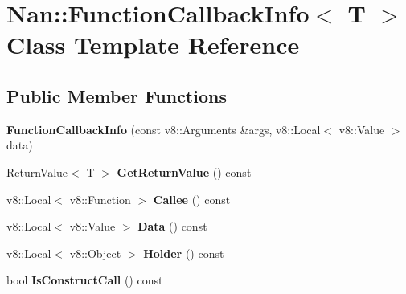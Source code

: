 \hypertarget{class_nan_1_1_function_callback_info}{}\section{Nan\+:\+:Function\+Callback\+Info$<$ T $>$ Class Template Reference}
\label{class_nan_1_1_function_callback_info}
\subsection*{Public Member Functions}
\begin{DoxyCompactItemize}
\item 
\mbox{\label{class_nan_1_1_function_callback_info_ab863f42f4fabad1d05c6285c05ee7789}} 
{\bfseries Function\+Callback\+Info} (const v8\+::\+Arguments \&args, v8\+::\+Local$<$ v8\+::\+Value $>$ data)
\item 
\mbox{\label{class_nan_1_1_function_callback_info_ad23cef574672532d7606b3959c6002ed}} 
\hyperlink{class_nan_1_1_return_value}{Return\+Value}$<$ T $>$ {\bfseries Get\+Return\+Value} () const
\item 
\mbox{\label{class_nan_1_1_function_callback_info_a86768f0fe5d5aa01c62a05710a7247c4}} 
v8\+::\+Local$<$ v8\+::\+Function $>$ {\bfseries Callee} () const
\item 
\mbox{\label{class_nan_1_1_function_callback_info_a6af24bfd6ea4839264fd92c24866e24f}} 
v8\+::\+Local$<$ v8\+::\+Value $>$ {\bfseries Data} () const
\item 
\mbox{\label{class_nan_1_1_function_callback_info_a91598ca49b4507592c64c23c9d580579}} 
v8\+::\+Local$<$ v8\+::\+Object $>$ {\bfseries Holder} () const
\item 
\mbox{\label{class_nan_1_1_function_callback_info_a49daa191eaa3aefd71b37e09bcae8634}} 
bool {\bfseries Is\+Construct\+Call} () const
\item 
\mbox{\label{class_nan_1_1_function_callback_info_a292ef764f9f70049b77f0125b76ce12f}} 

\end{DoxyCompactItemize}
